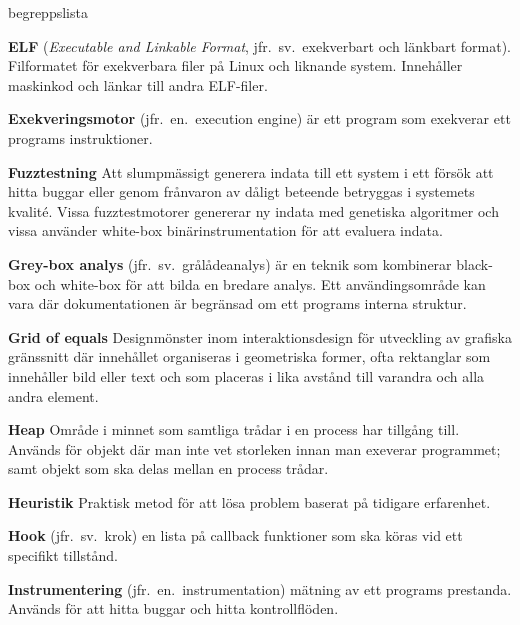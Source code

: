 \begin{labeling}{begreppslista}
    \item [\textbf{ELF}] (\emph{Executable and Linkable Format},
          jfr.\ sv.\ exekverbart och länkbart format). Filformatet för
    exekverbara filer på Linux och liknande system. Innehåller
    maskinkod och länkar till andra ELF-filer.

    \item [\textbf{Exekveringsmotor}] (jfr.\ en.\ execution engine) är
    ett program som exekverar ett programs instruktioner.

    \item [\textbf{Fuzztestning}] Att slumpmässigt generera indata
    till ett system i ett försök att hitta buggar eller genom
    frånvaron av dåligt beteende betryggas i systemets
    kvalité. Vissa fuzztestmotorer genererar ny indata med
    genetiska algoritmer och vissa använder white-box
    binärinstrumentation för att evaluera indata.

    \item [\textbf{Grey-box analys}] (jfr.\ sv.\ grålådeanalys) är en
    teknik som kombinerar black-box och white-box för att bilda en
    bredare analys. Ett användingsområde kan vara där
    dokumentationen är begränsad om ett programs interna struktur.

    \item [\textbf{Grid of equals}] Designmönster inom
    interaktionsdesign för utveckling av grafiska gränssnitt där
    innehållet organiseras i geometriska former, ofta rektanglar
    som innehåller bild eller text och som placeras i lika avstånd
    till varandra och alla andra element.

    \item [\textbf{Heap}] Område i minnet som samtliga trådar i en
    process har tillgång till. Används för objekt där man inte vet
    storleken innan man exeverar programmet; samt objekt som ska
    delas mellan en process trådar.

    \item [\textbf{Heuristik}] Praktisk metod för att lösa problem
    baserat på tidigare erfarenhet.

    \item [\textbf{Hook}] (jfr.\ sv.\ krok) en lista på callback
    funktioner som ska köras vid ett specifikt tillstånd.

    \item [\textbf{Instrumentering}] (jfr.\ en.\ instrumentation)
    mätning av ett programs prestanda. Används för att hitta
    buggar och hitta kontrollflöden.


\end{labeling}
